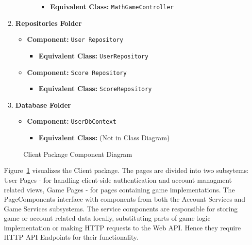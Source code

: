 \documentclass[11pt,a4paper]{article}
\newcommand{\inputdiagram}[1]{}
\begin{document}
\begin{enumerate}[label=\textbf{\arabic*.}, ref=\arabic*]
\begin{enumerate}[label=\textbf{\alph*.}, ref=\theenumi.\alph*]
\begin{itemize}
                        \begin{itemize}
                            \item \textbf{Equivalent Class:} \texttt{MathGameController}
                        \end{itemize}
                \end{itemize}
        \end{enumerate}
    \item \textbf{Repositories Folder}
        \begin{itemize}
            \item \textbf{Component:} \texttt{User Repository}
                \begin{itemize}
                    \item \textbf{Equivalent Class:} \texttt{UserRepository}
                \end{itemize}
            \item \textbf{Component:} \texttt{Score Repository}
                \begin{itemize}
                    \item \textbf{Equivalent Class:} \texttt{ScoreRepository}
                \end{itemize}
        \end{itemize}
    \item \textbf{Database Folder}
        \begin{itemize}
            \item \textbf{Component:} \texttt{UserDbContext}
                \begin{itemize}
                    \item \textbf{Equivalent Class:} (Not in Class Diagram)
                \end{itemize}
        \end{itemize}
\end{enumerate}

\begin{figure}[H]
    \centering
     \begin{adjustbox}{width=0.92\paperwidth,center}
         \inputdiagram{client_components.tex}
     \end{adjustbox}
    \caption{Client Package Component Diagram}
    \label{fig:client_components}
\end{figure}

Figure~\ref{fig:client_components} visualizes the Client package.  The pages
are divided into two subsytems: User Pages - for handling client-side
authentication and account managment related views, Game Pages - for pages
containing game implementations. The PageComponents interface with components
from both the Account Services and Game Services subsystems.  The service
components are responsible for storing game or account related data locally,
substituting parts of game logic implementation or making HTTP requests to
the Web API. Hence they require HTTP API Endpoints for their functionality.
\end{document}
